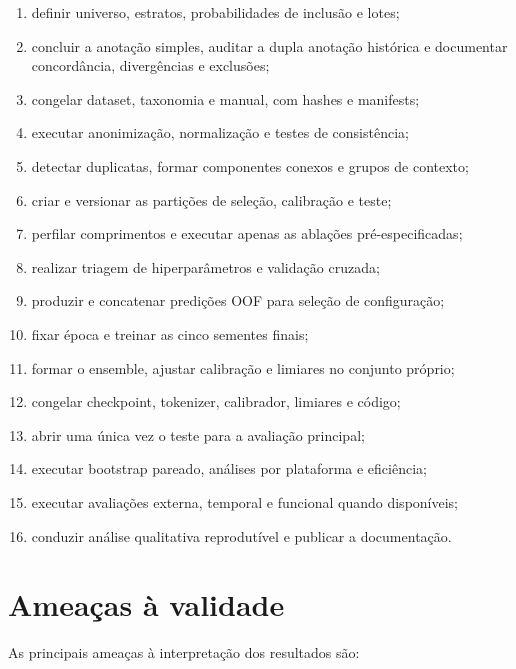 \begin{enumerate}
    \item definir universo, estratos, probabilidades de inclusão e lotes;
    \item concluir a anotação simples, auditar a dupla anotação histórica e
    documentar concordância, divergências e exclusões;
    \item congelar dataset, taxonomia e manual, com hashes e manifests;
    \item executar anonimização, normalização e testes de consistência;
    \item detectar duplicatas, formar componentes conexos e grupos de contexto;
    \item criar e versionar as partições de seleção, calibração e teste;
    \item perfilar comprimentos e executar apenas as ablações pré-especificadas;
    \item realizar triagem de hiperparâmetros e validação cruzada;
    \item produzir e concatenar predições OOF para seleção de configuração;
    \item fixar época e treinar as cinco sementes finais;
    \item formar o ensemble, ajustar calibração e limiares no conjunto próprio;
    \item congelar checkpoint, tokenizer, calibrador, limiares e código;
    \item abrir uma única vez o teste para a avaliação principal;
    \item executar bootstrap pareado, análises por plataforma e eficiência;
    \item executar avaliações externa, temporal e funcional quando disponíveis;
    \item conduzir análise qualitativa reprodutível e publicar a documentação.
\end{enumerate}

\section{Ameaças à validade}
\label{sec:ameacas-validade}

As principais ameaças à interpretação dos resultados são:

